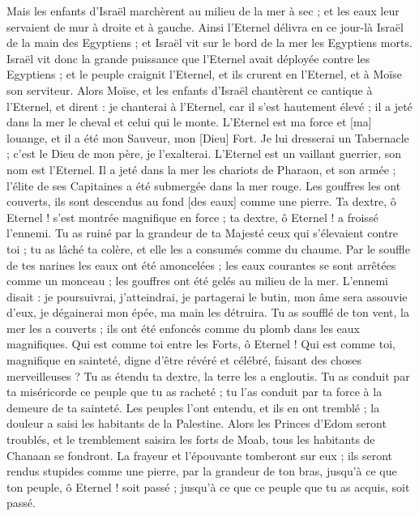 \begin{multicols}{2}
Mais les enfants d'Israël marchèrent au milieu de la mer à sec ; et les eaux leur servaient de mur à droite et à gauche.
Ainsi l'Eternel délivra en ce jour-là Israël de la main des Egyptiens ; et Israël vit sur le bord de la mer les Egyptiens morts.
Israël vit donc la grande puissance que l'Eternel avait déployée contre les Egyptiens ; et le peuple craignit l'Eternel, et ils crurent en l'Eternel, et à Moïse son serviteur.
\VerseOne{}Alors Moïse, et les enfants d'Israël chantèrent ce cantique à l'Eternel, et dirent : je chanterai à l'Eternel, car il s'est hautement élevé ; il a jeté dans la mer le cheval et celui qui le monte.
L'Eternel est ma force et [ma] louange, et il a été mon Sauveur, mon [Dieu] Fort. Je lui dresserai un Tabernacle ; c'est le Dieu de mon père, je l'exalterai.
L'Eternel est un vaillant guerrier, son nom est l'Eternel.
Il a jeté dans la mer les chariots de Pharaon, et son armée ; l'élite de ses Capitaines a été submergée dans la mer rouge.
Les gouffres les ont couverts, ils sont descendus au fond [des eaux] comme une pierre.
Ta dextre, ô Eternel ! s'est montrée magnifique en force ; ta dextre, ô Eternel ! a froissé l'ennemi.
Tu as ruiné par la grandeur de ta Majesté ceux qui s'élevaient contre toi ; tu as lâché ta colère, et elle les a consumés comme du chaume.
Par le souffle de tes narines les eaux ont été amoncelées ; les eaux courantes se sont arrêtées comme un monceau ; les gouffres ont été gelés au milieu de la mer.
L'ennemi disait : je poursuivrai, j'atteindrai, je partagerai le butin, mon âme sera assouvie d'eux, je dégainerai mon épée, ma main les détruira.
Tu as soufflé de ton vent, la mer les a couverts ; ils ont été enfoncés comme du plomb dans les eaux magnifiques.
Qui est comme toi entre les Forts, ô Eternel ! Qui est comme toi, magnifique en sainteté, digne d'être révéré et célébré, faisant des choses merveilleuses ?
Tu as étendu ta dextre, la terre les a engloutis.
Tu as conduit par ta miséricorde ce peuple que tu as racheté ; tu l'as conduit par ta force à la demeure de ta sainteté.
Les peuples l'ont entendu, et ils en ont tremblé ; la douleur a saisi les habitants de la Palestine.
Alors les Princes d'Edom seront troublés, et le tremblement saisira les forts de Moab, tous les habitants de Chanaan se fondront.
La frayeur et l'épouvante tomberont sur eux ; ils seront rendus stupides comme une pierre, par la grandeur de ton bras, jusqu'à ce que ton peuple, ô Eternel ! soit passé ; jusqu'à ce que ce peuple que tu as acquis, soit passé.

\end{multicols}
